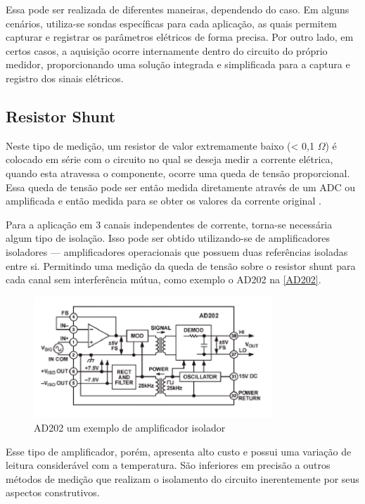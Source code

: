Essa pode ser realizada de diferentes maneiras, dependendo do caso. Em alguns cenários, utiliza-se sondas específicas para cada aplicação, as quais permitem capturar e registrar os parâmetros elétricos de forma precisa. Por outro lado, em certos casos, a aquisição ocorre internamente dentro do circuito do próprio medidor, proporcionando uma solução integrada e simplificada para a captura e registro dos sinais elétricos.

\subsection{Resistor Shunt}\label{subsec:resiShunt}
Neste tipo de medição, um resistor de valor extremamente baixo (< 0,1 $\Omega$) é colocado em série com o circuito no qual se deseja medir a corrente elétrica, quando esta atravessa o componente, ocorre uma queda de tensão proporcional. Essa queda de tensão pode ser então medida diretamente através de um \gls{ADC} ou amplificada e então medida para se obter os valores da corrente original \citep{curr_sens_tech}.

Para a aplicação em 3 canais independentes de corrente, torna-se necessária algum tipo de isolação. Isso pode ser obtido utilizando-se de amplificadores isoladores --- amplificadores operacionais que possuem duas referências isoladas entre si. Permitindo uma medição da queda de tensão sobre o resistor shunt para cada canal sem interferência mútua, como exemplo o AD202 na \autoref{AD202}.

\begin{figure}[htb!]
    \caption{AD202 um exemplo de amplificador isolador}
    \label{AD202}
    \includegraphics[width=0.8\textwidth]{figuras/AD202-ampop-isolado.png}
\end{figure}
    
Esse tipo de amplificador, porém, apresenta alto custo e possui uma variação de leitura considerável com a temperatura. São inferiores em precisão a outros métodos de medição que realizam o isolamento do circuito inerentemente por seus aspectos construtivos. 

